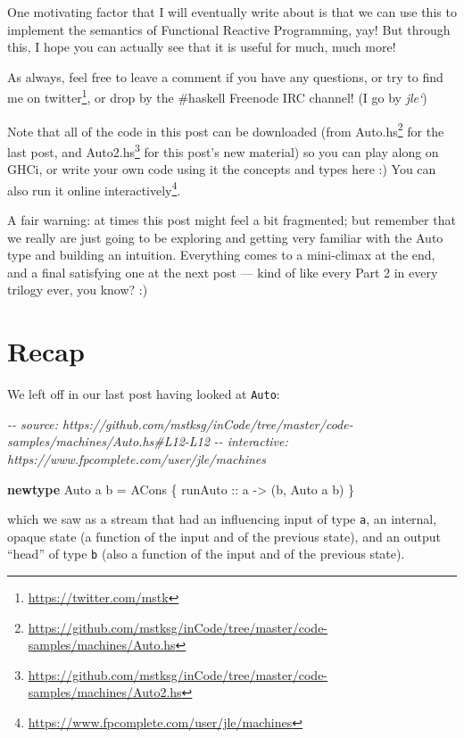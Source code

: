 \documentclass[]{article}
\newenvironment{Shaded}{}{}
\newcommand{\CommentTok}[1]{\textcolor[rgb]{0.38,0.63,0.69}{\textit{#1}}}
\newcommand{\DataTypeTok}[1]{\textcolor[rgb]{0.56,0.13,0.00}{#1}}
\newcommand{\KeywordTok}[1]{\textcolor[rgb]{0.00,0.44,0.13}{\textbf{#1}}}
\newcommand{\NormalTok}[1]{#1}
\newcommand{\OtherTok}[1]{\textcolor[rgb]{0.00,0.44,0.13}{#1}}
\renewcommand{\href}[2]{#2\footnote{\url{#1}}}
\begin{document}
One motivating factor that I will eventually write about is that we can use this
to implement the semantics of Functional Reactive Programming, yay! But through
this, I hope you can actually see that it is useful for much, much more!

As always, feel free to leave a comment if you have any questions, or try to
find me on \href{https://twitter.com/mstk}{twitter}, or drop by the \#haskell
Freenode IRC channel! (I go by \emph{jle`})

Note that all of the code in this post can be downloaded (from
\href{https://github.com/mstksg/inCode/tree/master/code-samples/machines/Auto.hs}{Auto.hs}
for the last post, and
\href{https://github.com/mstksg/inCode/tree/master/code-samples/machines/Auto2.hs}{Auto2.hs}
for this post's new material) so you can play along on GHCi, or write your own
code using it the concepts and types here :) You can also run it
\href{https://www.fpcomplete.com/user/jle/machines}{online interactively}.

A fair warning: at times this post might feel a bit fragmented; but remember
that we really are just going to be exploring and getting very familiar with the
Auto type and building an intuition. Everything comes to a mini-climax at the
end, and a final satisfying one at the next post --- kind of like every Part 2
in every trilogy ever, you know? :)

\section{Recap}\label{recap}

We left off in our last post having looked at \texttt{Auto}:

\begin{Shaded}
\begin{Highlighting}[]
\CommentTok{{-}{-} source: https://github.com/mstksg/inCode/tree/master/code{-}samples/machines/Auto.hs\#L12{-}L12}
\CommentTok{{-}{-} interactive: https://www.fpcomplete.com/user/jle/machines}

\KeywordTok{newtype} \DataTypeTok{Auto}\NormalTok{ a b }\OtherTok{=} \DataTypeTok{ACons}\NormalTok{ \{}\OtherTok{ runAuto ::}\NormalTok{ a }\OtherTok{{-}\textgreater{}}\NormalTok{ (b, }\DataTypeTok{Auto}\NormalTok{ a b) \}}
\end{Highlighting}
\end{Shaded}

which we saw as a stream that had an influencing input of type \texttt{a}, an
internal, opaque state (a function of the input and of the previous state), and
an output ``head'' of type \texttt{b} (also a function of the input and of the
previous state).
\end{document}
